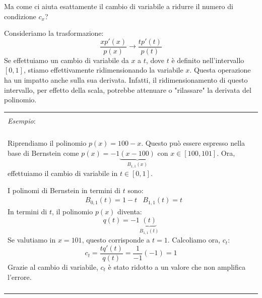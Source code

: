 \documentclass{article}
\numberwithin{equation}{section}
\newenvironment{example}
{\begin{center}
        \begin{tabular}{|p{0.9\textwidth}|}
            \hline \\ 
            \textit{Esempio}: \\\\ 
        }
        {
            \\\\ \hline
        \end{tabular}
    \end{center}
}
\begin{document}
Ma come ci aiuta esattamente il cambio di variabile a ridurre il numero di
condizione $c_x$?

Consideriamo la trasformazione:
$$\frac{xp'(x)}{p(x)}\rightarrow \frac{tp'(t)}{p(t)}$$
Se effettuiamo un cambio di variabile da $x$ a $t$, dove $t$ è definito
nell'intervallo $[0,1]$, stiamo effettivamente ridimensionando la variabile $x$.
Questa operazione ha un impatto anche sulla sua derivata. Infatti, il
ridimensionamento di questo intervallo, per effetto della scala, 
potrebbe attenuare o "rilassare" la derivata del polinomio.

\begin{example}
   Riprendiamo il polinomio $p(x)=100-x$. Questo può essere espresso nella
   base di Bernstein come
   $p(x)=-1\underbrace{(x-100)}_{B_{1,1}(x)}$ con $x\in[100,101]$. Ora, 
   effettuiamo il cambio di variabile in $t\in[0,1]$.

   I polinomi di Bernstein in termini di $t$ sono:
   \begin{equation*}
       \begin{aligned}
           & B_{0,1}(t)=1-t & B_{1,1}(t)=t
       \end{aligned}
   \end{equation*}
   In termini di $t$, il polinomio $p(x)$ diventa:
   $$q(t)=-1\underbrace{(t)}_{B_{1,1}(t)}$$
   Se valutiamo in $x=101$, questo corrisponde a $t=1$. Calcoliamo ora, $c_t$:
   $$c_t=\frac{tq'(t)}{q(t)}=\frac{1}{-1}(-1)=1$$
    Grazie al cambio di variabile, $c_t$ è stato ridotto a un valore che non
    amplifica l'errore.
\end{example}
\end{document}
